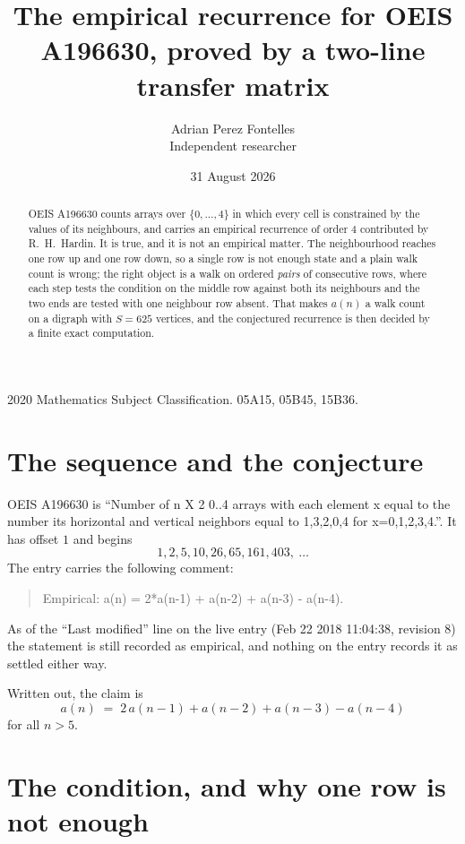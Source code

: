 \documentclass[11pt,a4paper]{article}
\title{The empirical recurrence for OEIS A196630, proved by a two-line transfer matrix}
\author{Adrian Perez Fontelles\\ \small Independent researcher}
\date{31 August 2026}
\theoremstyle{plain}
\theoremstyle{definition}
\begin{document}
\maketitle

\begin{abstract}
OEIS A196630 counts arrays over $\{0,\dots,4\}$ in which every cell is constrained by the
values of its neighbours, and carries an empirical recurrence of order $4$ contributed
by R.~H.~Hardin. It is true, and it is not an empirical matter. The neighbourhood reaches one
row up and one row down, so a single row is not enough state and a plain walk count
is wrong; the right object is a walk on ordered \emph{pairs} of consecutive rows, where
each step tests the condition on the middle row against both its neighbours and the two
ends are tested with one neighbour row absent. That makes $a(n)$ a walk count on a digraph
with $S=625$ vertices, and the conjectured recurrence is then decided by a finite exact
computation.
\end{abstract}

\noindent\small 2020 Mathematics Subject Classification. 05A15, 05B45, 15B36.\normalsize

\section{The sequence and the conjecture}

OEIS A196630 is ``Number of n X 2 0..4 arrays with each element x equal to the number its horizontal and vertical neighbors equal to 1,3,2,0,4 for x=0,1,2,3,4.''. It has offset $1$ and begins
\[
1, 2, 5, 10, 26, 65, 161, 403,\ \dots
\]
The entry carries the following comment:
\begin{quote}\small
Empirical: a(n) = 2*a(n-1) + a(n-2) + a(n-3) - a(n-4).
\end{quote}
As of the ``Last modified'' line on the live entry (Feb 22 2018 11:04:38, revision 8) the statement is
still recorded as empirical, and nothing on the entry records it as settled either way.

Written out, the claim is
\begin{equation}\label{eq:conj}
a(n)\;=\;2\,a(n-1) + a(n-2) + a(n-3) - a(n-4)
\end{equation}
for all $n>5$.

\section{The condition, and why one row is not enough}
\end{document}
